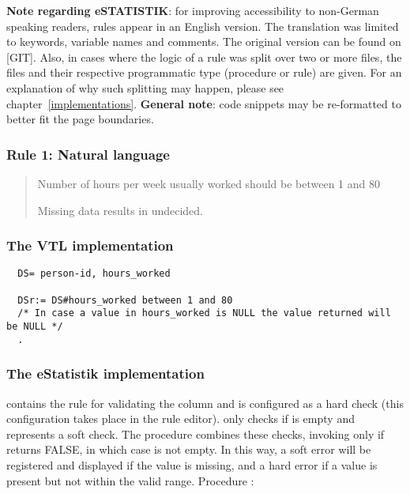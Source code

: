 \textbf{Note regarding eSTATISTIK}: for improving accessibility to non-German speaking readers, rules appear in an English version. The translation was limited to keywords, variable names and comments. The original version can be found on [GIT]. Also, in cases where the logic of a rule was split over two or more files, the files and their respective programmatic type (procedure or rule) are given. For an explanation of why such splitting may happen, please see chapter~\ref{implementations}.
\linebreak
\linebreak
\textbf{General note}: code snippets may be re-formatted to better fit the page boundaries.

\subsubsection*{  Rule 1: Natural language}
\begin{quote}

Number of hours per week usually worked should be between 1 and 80

Missing data results in undecided.


\end{quote}
\subsubsection*{The VTL implementation}
\begin{verbatim}
  DS= person-id, hours_worked

  DSr:= DS#hours_worked between 1 and 80
  /* In case a value in hours_worked is NULL the value returned will be NULL */
  .
\end{verbatim}
\subsubsection*{The eStatistik implementation}

 contains the rule for validating the column   and is configured as a hard check (this configuration takes place in the rule editor).  only checks if  is empty and represents a soft check. The procedure  combines these checks, invoking  only if  returns FALSE, in which case  is not empty. In this way, a soft error will be registered and displayed if the value is missing, and a hard error if a value is present but not within the valid range.
\linebreak
\linebreak
Procedure :

